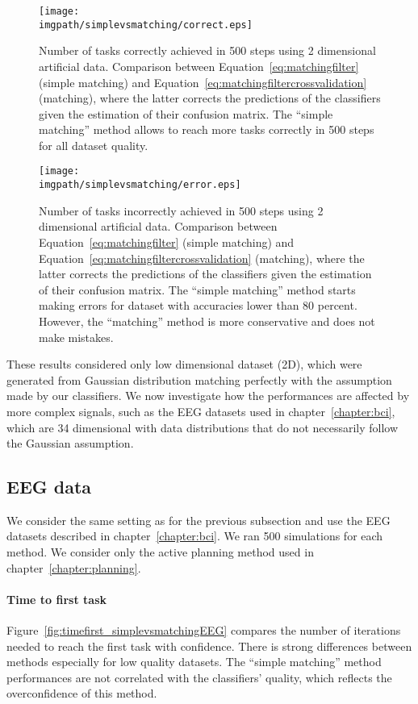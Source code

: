 \begin{figure}[!htbp]
\centering
\texttt{[image: \\imgpath/simplevsmatching/correct.eps]}
\caption{Number of tasks correctly achieved in 500 steps using 2 dimensional artificial data. Comparison between Equation~\ref{eq:matchingfilter} (simple matching) and Equation~\ref{eq:matchingfiltercrossvalidation} (matching), where the latter corrects the predictions of the classifiers given the estimation of their confusion matrix. The ``simple matching'' method allows to reach more tasks correctly in 500 steps for all dataset quality.
}
\label{fig:nCorrect_simplevsmatching}
\end{figure} 

\begin{figure}[!htbp]
\centering
\texttt{[image: \\imgpath/simplevsmatching/error.eps]}
\caption{Number of tasks incorrectly achieved in 500 steps using 2 dimensional artificial data. Comparison between Equation~\ref{eq:matchingfilter} (simple matching) and Equation~\ref{eq:matchingfiltercrossvalidation} (matching), where the latter corrects the predictions of the classifiers given the estimation of their confusion matrix. The ``simple matching'' method starts making errors for dataset with accuracies lower than 80 percent. However, the ``matching'' method is more conservative and does not make mistakes.}
\label{fig:nWrongEEG_simplevsmatching}
\end{figure} 

\transition

These results considered only low dimensional dataset (2D), which were generated from Gaussian distribution matching perfectly with the assumption made by our classifiers. We now investigate how the performances are affected by more complex signals, such as the EEG datasets used in chapter~\ref{chapter:bci}, which are 34 dimensional with data distributions that do not necessarily follow the Gaussian assumption.

\subsection{EEG data}

We consider the same setting as for the previous subsection and use the EEG datasets described in chapter~\ref{chapter:bci}. We ran 500 simulations for each method. We consider only the active planning method used in chapter~\ref{chapter:planning}.

\paragraph{Time to first task} Figure~\ref{fig:timefirst_simplevsmatchingEEG} compares the number of iterations needed to reach the first task with confidence. There is strong differences between methods especially for low quality datasets. The ``simple matching'' method performances are not correlated with the classifiers' quality, which reflects the overconfidence of this method.

